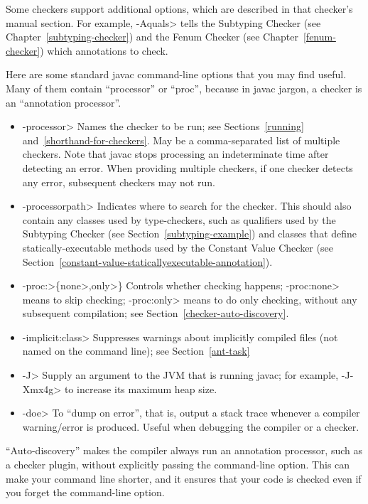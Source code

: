\noindent
Some checkers support additional options, which are described in that
checker's manual section.
For example, \<-Aquals> tells
the Subtyping Checker (see Chapter~\ref{subtyping-checker}) and the Fenum Checker
(see Chapter~\ref{fenum-checker}) which annotations to check.


Here are some standard javac command-line options that you may find useful.
Many of them contain ``processor'' or ``proc'', because in javac jargon, a
checker is an ``annotation processor''.

\begin{itemize}
\item \<-processor> Names the checker to be
  run; see Sections~\ref{running} and~\ref{shorthand-for-checkers}.
  May be a comma-separated list of multiple checkers.  Note that javac
  stops processing an indeterminate time after detecting an error.  When
  providing multiple checkers, if one checker detects any error, subsequent
  checkers may not run.
\item \<-processorpath> Indicates where to search for the
  checker.  This should also contain any classes used by type-checkers,
  such as qualifiers used by the Subtyping Checker (see
  Section~\ref{subtyping-example}) and classes that define
  statically-executable methods used by the Constant Value Checker (see
  Section~\ref{constant-value-staticallyexecutable-annotation}).
\item \<-proc:>\{\<none>,\<only>\} Controls whether checking
  happens; \<-proc:none>
  means to skip checking; \<-proc:only> means to do only
  checking, without any subsequent compilation; see
  Section~\ref{checker-auto-discovery}.
\item \<-implicit:class> Suppresses warnings about implicitly compiled files
  (not named on the command line); see Section~\ref{ant-task}
\item \<-J> Supply an argument to the JVM that is running javac;
  for example, \<-J-Xmx4g> to increase its maximum heap size.
\item \<-doe> To ``dump on error'', that is, output a stack trace
  whenever a compiler warning/error is produced. Useful when debugging
  the compiler or a checker.
\end{itemize}



``Auto-discovery'' makes the  compiler always run an
annotation processor, such as a checker
plugin, without explicitly passing the 
command-line option.  This can make your command line shorter, and it ensures
that your code is checked even if you forget the command-line option.

